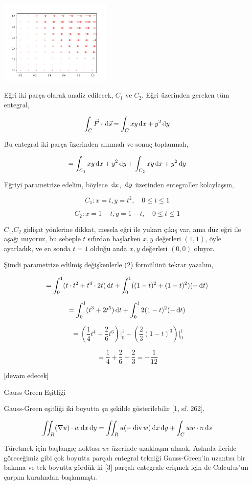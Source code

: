 \documentclass[12pt,fleqn]{article}\usepackage{../../common}
\begin{document}
\includegraphics[width=15em]{calc_multi_75_green_01.jpg}

Eğri iki parça olarak analiz edilecek, $C_1$ ve $C_2$.  Eğri üzerinden gereken
tüm entegral,

$$
\int_C \vec{F} \cdot \,\mathrm{d}{\vec{s}} = \int_C xy \,\mathrm{d} x + y^2 \,\mathrm{d} y
$$

Bu entegral iki parça üzerinden alınmalı ve sonuç toplanmalı,

$$
= \int_{C_1} xy \,\mathrm{d} x + y^2 \,\mathrm{d} y + \int_{C_2} xy \,\mathrm{d} x + y^2 \,\mathrm{d} y
\label{2}
$$

Eğriyi parametrize edelim, böylece $\,\mathrm{d} x$, $\,\mathrm{d} y$ üzerinden entegraller
kolaylaşsın,

$$
C_1: x = t, y = t^2, \quad 0 \le t \le 1
$$

$$
C_2: x = 1-t, y = 1-t, \quad 0 \le t \le 1
$$

$C_1$,$C_2$ gidişat yönlerine dikkat, mesela eğri ile yukarı çıkış var, ama düz
eğri ile aşağı ınıyoruz, bu sebeple $t$ sıfırdan başlarken $x,y$ değerleri
$(1,1)$, öyle ayarladık, ve en sonda $t=1$ olduğu anda $x,y$ değerleri $(0,0)$
oluyor. 

Şimdi parametrize edilmiş değişkenlerle (2) formülünü tekrar yazalım,

$$
= \int_{0}^{1} ( t \cdot t^2 + t^4 \cdot 2t ) \,\mathrm{d} t +
\int_{0}^{1} ((1-t)^2 + (1-t)^2) (-\,\mathrm{d} t)
$$

$$
= \int_{0}^{1} (t^3 + 2t^5) \,\mathrm{d} t + \int _{0}^{1} 2 (1-t)^2 (-\,\mathrm{d} t)
$$

$$
= (\frac{1}{4} t^4 + \frac{2}{6} t^6) \big\vert_{0}^{1} +
(\frac{2}{3} (1-t)^3 ) \big\vert_{0}^{1}
$$

$$
= \frac{1}{4} + \frac{2}{6} - \frac{2}{3} = -\frac{1}{12}
$$

[devam edecek]

Gauss-Green Eşitliği

Gauss-Green eşitliği iki boyutta şu şekilde gösterilebilir [1, sf. 262],

$$
\iint_R (\nabla u ) \cdot w \,\mathrm{d} x \,\mathrm{d} y =
\iint_R u (- \operatorname{div} w) \,\mathrm{d} x \,\mathrm{d} y + \int_C u w \cdot n \,\mathrm{d} s
$$

Türetmek için başlangıç noktası $uv$ üzerinde uzaklaşım almak. Aslında
ileride göreceğimiz gibi çok boyutta parçalı entegral tekniği Gauss-Green'in
uzantısı bir bakıma ve tek boyutta gördük ki [3] parçalı entegrale erişmek
için de Calculus'un çarpım kuralından başlanmıştı.
\end{document}
